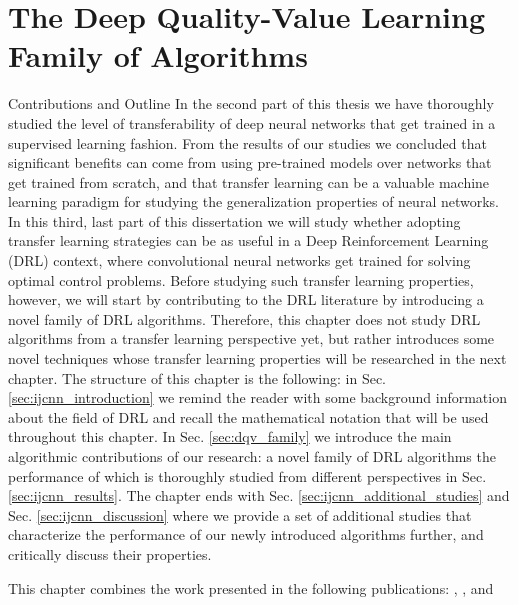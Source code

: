 
\chapter{The Deep Quality-Value Learning Family of Algorithms} %
\label{ch:dqv_family_of_algorithms} %


\begin{remark}{Contributions and Outline}
	In the second part of this thesis we have thoroughly studied the level of transferability of deep neural networks that get trained in a supervised learning fashion. From the results of our studies we concluded that significant benefits can come from using pre-trained models over networks that get trained from scratch, and that transfer learning can be a valuable machine learning paradigm for studying the generalization properties of neural networks. In this third, last part of this dissertation we will study whether adopting transfer learning strategies can be as useful in a Deep Reinforcement Learning (DRL) context, where convolutional neural networks get trained for solving optimal control problems. Before studying such transfer learning properties, however, we will start by contributing to the DRL literature by introducing a novel family of DRL algorithms. Therefore, this chapter does not study DRL algorithms from a transfer learning perspective yet, but rather introduces some novel techniques whose transfer learning properties will be researched in the next chapter.
	The structure of this chapter is the following: in Sec. \ref{sec:ijcnn_introduction} we remind the reader with some background information about the field of DRL and recall the mathematical notation that will be used throughout this chapter. In Sec. \ref{sec:dqv_family} we introduce the main algorithmic contributions of our research: a novel family of DRL algorithms the performance of which is thoroughly studied from different perspectives in Sec. \ref{sec:ijcnn_results}. The chapter ends with Sec. \ref{sec:ijcnn_additional_studies} and Sec. \ref{sec:ijcnn_discussion} where we provide a set of additional studies that characterize the performance of our newly introduced algorithms further, and critically discuss their properties. 
\vspace{5mm}

This chapter combines the work presented in the following publications: \citet{sabatelli2018deepqv}, \citet{sabatelli2019approximating}, and \citet{sabatelli2020deep}
\end{remark}

